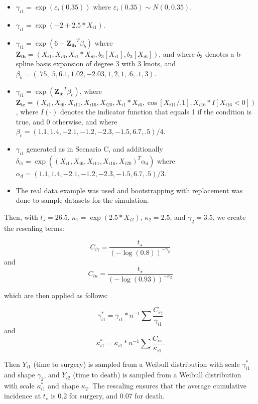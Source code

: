 \documentclass{statsoc}
\begin{document}
\begin{itemize}
    \item[Scenario 0:] $\gamma_{i1} = \exp{(\varepsilon_{i}(0.35))}$ where $\varepsilon_{i}(0.35) \sim N(0, 0.35)$.
    \item[Scenario A:] $\gamma_{i1} = \exp{(-2 + 2.5 * X_{i1})}$.
    \item[Scenario B:] $\gamma_{i1} = \exp{(6 + \mathbf{Z_{ib}}^T \beta_b)}$ where $\mathbf{Z_{ib}} = (X_{i1}, X_{i6}, X_{i1} * X_{i6}, b_3[X_{i1}], b_3[X_{i6}])$, and where $b_3$ denotes a b-spline basis expansion of degree 3 with 3 knots, and $\beta_b = (.75, .5, 6.1, 1.02, -2.03, 1, 2, 1, .6, .1, 3)$.
    \item[Scenario C:] $\gamma_{i1} = \exp{(\mathbf{Z_{ic}}^T \beta_c)}$, where $\mathbf{Z_{ic}} = (X_{i1}, X_{i6}, X_{i11}, X_{i16}, X_{i20}, X_{i1} * X_{i6}, \cos[X_{i11} / .1], X_{i16} * I[X_{i16} < 0])$, where $I(\cdot)$ denotes the indicator function that equals 1 if the condition is true, and 0 otherwise, and where $\beta_c = (1.1, 1.4, -2.1, -1.2, -2.3, -1.5, 6.7, .5) / 4$. 
    \item[Scenario D:] $\gamma_{i1}$ generated as in Scenario C, and additionally $\delta_{i1} = \exp((X_{i1}, X_{i6}, X_{i11}, X_{i16},X_{i20})^T \alpha_d)$ where $\alpha_d = (1.1, 1.4, -2.1, -1.2, -2.3, -1.5, 6.7, .5) / 3$.
    \item[Scenario E:] The real data example was used and bootstrapping with replacement was done to sample datasets for the simulation. 
\end{itemize}

Then, with $t_{\star} = 26.5$, $\kappa_1 = \exp(2.5 * X_{i2})$, $\kappa_2 = 2.5$, and $\gamma_2 = 3.5$, we create the rescaling terms: 

$$C_{i\gamma} = \frac{t_{\star}}{(-\log(0.8))^{-\gamma_2}}$$
and
$$C_{i\kappa} = \frac{t_{\star}}{(-\log(0.93))^{-\kappa_2}}$$ 

which are then applied as follows: 

$$
\gamma^*_{i1} = \gamma_{i1} * n^{-1}\sum \frac{C_{i\gamma}}{\gamma_{i1}}
$$
and 
$$
\kappa^*_{i1} = \kappa_{i1} * n^{-1}\sum \frac{C_{i\kappa}}{\kappa_{i1}}. 
$$

Then $Y_{i1}$ (time to surgery) is sampled from a Weibull distribution with scale $\gamma_{i1}^*$ and shape $\gamma_2$, and $Y_{i2}$ (time to death) is sampled from a Weibull distribution with scale $\kappa_{i1}^*$ and shape $\kappa_2$. The rescaling ensures that the average cumulative incidence at $t_{\star}$ is 0.2 for surgery, and 0.07 for death. 
\end{document}
